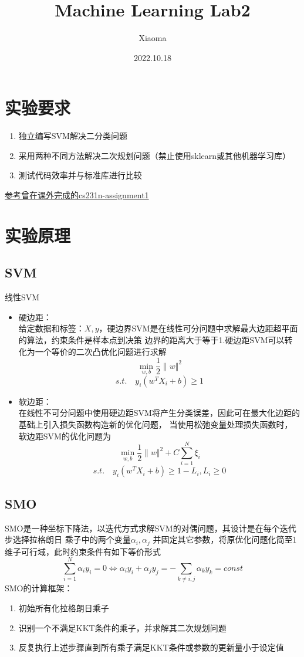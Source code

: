 \documentclass[12pt, a4paper, oneside]{ctexart}
\title{Machine Learning Lab2}
\author{Xiaoma}
\date{2022.10.18}
\begin{document}
\maketitle
\section*{实验要求}
\begin{enumerate}
    \item 独立编写SVM解决二分类问题
    \item 采用两种不同方法解决二次规划问题（禁止使用sklearn或其他机器学习库）
    \item 测试代码效率并与标准库进行比较
\end{enumerate}
\href{https://github.com/gsb-ustc/CS231n-2020-assignment-solution}{参考曾在课外完成的cs231n-assignment1}

\section*{实验原理}
\subsection*{SVM}
线性SVM
\begin{itemize}
    \item 硬边距：\\
    给定数据和标签：$X,y$，硬边界SVM是在线性可分问题中求解最大边距超平面的算法，约束条件是样本点到决策
    边界的距离大于等于1.硬边距SVM可以转化为一个等价的二次凸优化问题进行求解
    $$\min_{w,b} \frac{1}{2}\| w\Vert^{2} $$
    $$s.t. \quad y_{i}(w^{T}X_{i}+b) \geq 1$$
    \item 软边距：\\
    在线性不可分问题中使用硬边距SVM将产生分类误差，因此可在最大化边距的基础上引入损失函数构造新的优化问题，
    当使用松弛变量处理损失函数时，软边距SVM的优化问题为
    $$\min_{w,b} \frac{1}{2}\| w\Vert^{2}+C\sum_{i=1}^{N}\xi _{i}$$
    $$s.t. \quad y_{i}(w^{T}X_{i}+b) \geq 1 - L_{i},L_{i}\geq 0 $$
\end{itemize}
\subsection*{SMO}
SMO是一种坐标下降法，以迭代方式求解SVM的对偶问题，其设计是在每个迭代步选择拉格朗日
乘子中的两个变量$\alpha_{i},\alpha_{j}$ 并固定其它参数，将原优化问题化简至1维子可行域，此时约束条件有如下等价形式
$$\sum_{i=1}^{N}\alpha_{i}y_{i}=0 \Longleftrightarrow \alpha_{i}y_{i}+\alpha_{j}y_{j}=-\sum_{k\neq i,j}\alpha_{k}y_{k}=const$$
SMO的计算框架：
\begin{enumerate}
    \item 初始所有化拉格朗日乘子
    \item 识别一个不满足KKT条件的乘子，并求解其二次规划问题
    \item 反复执行上述步骤直到所有乘子满足KKT条件或参数的更新量小于设定值
\end{enumerate}
\end{document}
